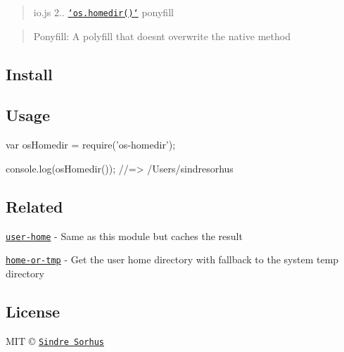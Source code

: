 \begin{quote}
io.\+js 2.. \href{https://iojs.org/api/os.html#os_os_homedir}{\tt `os.homedir()`} ponyfill \end{quote}


\begin{quote}
Ponyfill\+: A polyfill that doesn\textquotesingle{}t overwrite the native method \end{quote}


\subsection*{Install}




\subsection*{Usage}


\begin{DoxyCode}
var osHomedir = require(\textcolor{stringliteral}{'os-homedir'});

console.log(osHomedir());
\textcolor{comment}{//=> /Users/sindresorhus}
\end{DoxyCode}


\subsection*{Related}


\begin{DoxyItemize}
\item \href{https://github.com/sindresorhus/user-home}{\tt user-\/home} -\/ Same as this module but caches the result
\item \href{https://github.com/sindresorhus/home-or-tmp}{\tt home-\/or-\/tmp} -\/ Get the user home directory with fallback to the system temp directory
\end{DoxyItemize}

\subsection*{License}

M\+I\+T © \href{http://sindresorhus.com}{\tt Sindre Sorhus} 